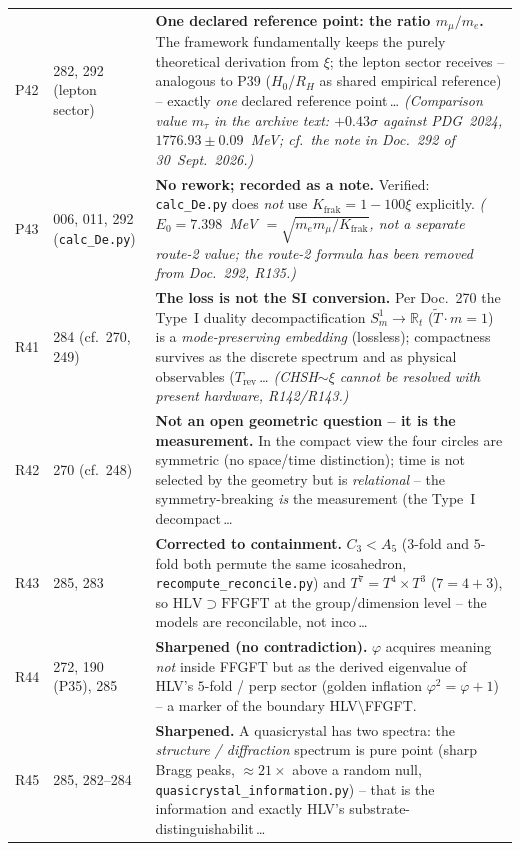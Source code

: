 \begin{longtable}{@{}p{0.9cm}p{3.1cm}p{10.2cm}@{}}
P42 & 282, 292 (lepton sector) & \textbf{One declared reference point: the ratio $m_\mu/m_e$.} The framework fundamentally keeps the purely theoretical derivation from $\xi$; the lepton sector receives -- analogous to P39 ($H_0$/$R_H$ as shared empirical reference) -- exactly \emph{one} declared reference point\,\ldots{} \emph{(Comparison value $m_\tau$ in the archive text: $+0.43\sigma$ against PDG~2024, $1776.93\pm0.09$~MeV; cf.\ the note in Doc.~292 of 30~Sept.~2026.)} \\
P43 & 006, 011, 292 (\texttt{calc\_De.py}) & \textbf{No rework; recorded as a note.} Verified: \texttt{calc\_De.py} does \emph{not} use $K_{\text{frak}}=1-100\xi$ explicitly. \emph{($E_0=7.398$~MeV $=\sqrt{m_em_\mu/K_{\mathrm{frak}}}$, not a separate route-2 value; the route-2 formula has been removed from Doc.~292, R135.)} \\
R41 & 284 (cf.\ 270, 249) & \textbf{The loss is not the SI conversion.} Per Doc.~270 the Type~I duality decompactification $S^1_m\!\to\!\mathbb{R}_t$ ($\tilde{T}\cdot m=1$) is a \emph{mode-preserving embedding} (lossless); compactness survives as the discrete spectrum and as physical observables ($T_\text{rev}$\,\ldots{} \emph{(CHSH$\sim\xi$ cannot be resolved with present hardware, R142/R143.)} \\
R42 & 270 (cf.\ 248) & \textbf{Not an open geometric question -- it is the measurement.} In the compact view the four circles are symmetric (no space/time distinction); time is not selected by the geometry but is \emph{relational} -- the symmetry-breaking \emph{is} the measurement (the Type~I decompact\,\ldots \\
R43 & 285, 283 & \textbf{Corrected to containment.} $C_3<A_5$ ($3$-fold and $5$-fold both permute the same icosahedron, \texttt{recompute\_reconcile.py}) and $T^7=T^4\times T^3$ ($7=4+3$), so $\mathrm{HLV}\supset\mathrm{FFGFT}$ at the group/dimension level -- the models are reconcilable, not inco\,\ldots \\
R44 & 272, 190 (P35), 285 & \textbf{Sharpened (no contradiction).} $\varphi$ acquires meaning \emph{not} inside FFGFT but as the derived eigenvalue of HLV's $5$-fold / perp sector (golden inflation $\varphi^2=\varphi+1$) -- a marker of the boundary HLV$\setminus$FFGFT. \\
R45 & 285, 282--284 & \textbf{Sharpened.} A quasicrystal has two spectra: the \emph{structure / diffraction} spectrum is pure point (sharp Bragg peaks, $\approx21\times$ above a random null, \texttt{quasicrystal\_information.py}) -- that is the information and exactly HLV's substrate-distinguishabilit\,\ldots \\

\end{longtable}
